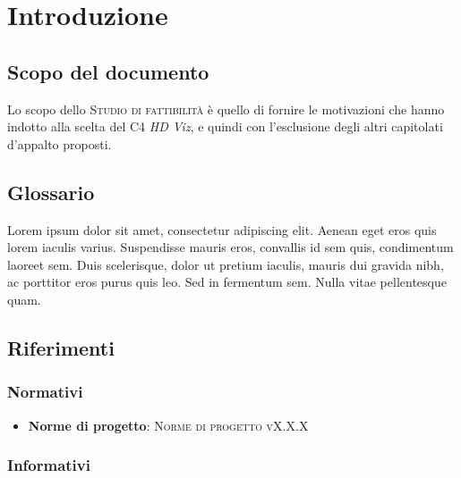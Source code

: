 \documentclass{article}
\begin{document}


\section{Introduzione}%
\label{sec:introduzione}

\subsection{Scopo del documento}%
\label{sub:scopo_del_documento}
Lo scopo dello \textsc{Studio di fattibilità} è quello di fornire le motivazioni che hanno indotto alla scelta del  C4 \emph{HD Viz}, e quindi con l'esclusione degli altri capitolati d'appalto proposti.

\subsection{Glossario}%
\label{sub:glossario}
Lorem ipsum dolor sit amet, consectetur adipiscing elit. Aenean eget eros quis lorem iaculis varius. Suspendisse mauris eros, convallis id sem quis, condimentum laoreet sem. Duis scelerisque, dolor ut pretium iaculis, mauris dui gravida nibh, ac porttitor eros purus quis leo. Sed in fermentum sem. Nulla vitae pellentesque quam.

\subsection{Riferimenti}%
\label{sub:riferimenti}

\subsubsection{Normativi}%
\label{subs:normativi}

\begin{itemize}
  \item \textbf{Norme di progetto}: \textsc{Norme di progetto vX.X.X}
\end{itemize}

\subsubsection{Informativi}%
\label{subs:informativi}
\end{document}
